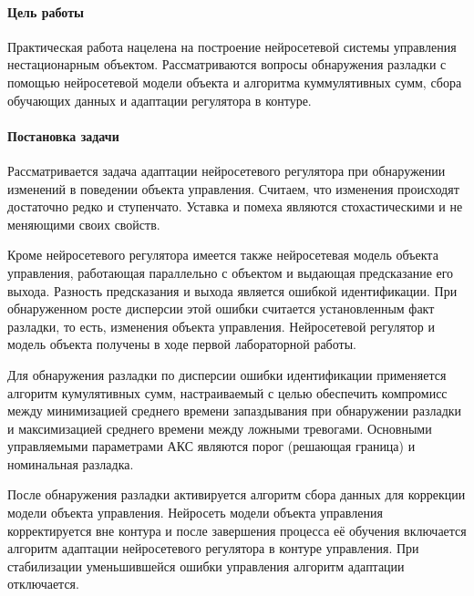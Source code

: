 \paragraph{Цель работы}

Практическая работа нацелена на построение нейросетевой системы
управления нестационарным объектом.  Рассматриваются вопросы
обнаружения разладки с помощью нейросетевой модели объекта и алгоритма
куммулятивных сумм, сбора обучающих данных и адаптации
регулятора в контуре.

\paragraph{Постановка задачи}

Рассматривается задача адаптации нейросетевого регулятора при
обнаружении изменений в поведении объекта управления.  Считаем, что
изменения происходят достаточно редко и ступенчато.  Уставка и помеха
являются стохастическими и не меняющими своих свойств.

Кроме нейросетевого регулятора имеется также нейросетевая модель
объекта управления, работающая параллельно с объектом и выдающая
предсказание его выхода.  Разность предсказания и выхода является
ошибкой идентификации.  При обнаруженном росте дисперсии этой ошибки
считается установленным факт разладки, то есть, изменения объекта
управления.  Нейросетевой регулятор и модель объекта получены в ходе
первой лабораторной работы.

Для обнаружения разладки по дисперсии ошибки идентификации применяется
алгоритм кумулятивных сумм, настраиваемый с целью обеспечить
компромисс между минимизацией среднего времени запаздывания при
обнаружении разладки и максимизацией среднего времени между ложными
тревогами.  Основными управляемыми параметрами АКС являются порог
(решающая граница) и номинальная разладка.

После обнаружения разладки активируется алгоритм сбора данных для
коррекции модели объекта управления.  Нейросеть модели объекта
управления корректируется вне контура и после завершения процесса её
обучения включается алгоритм адаптации нейросетевого регулятора в
контуре управления.  При стабилизации уменьшившейся ошибки управления
алгоритм адаптации отключается.

